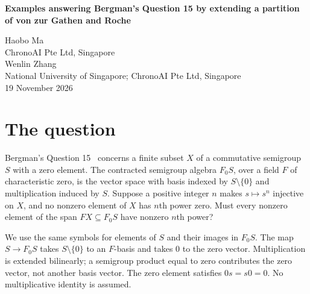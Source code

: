 \documentclass[11pt]{article}
\begin{document}
\begin{center}
{\Large\bfseries Examples answering Bergman's Question 15 by extending
a partition of von zur Gathen and Roche}\par
\vspace{9pt}
Haobo Ma\\
{\small ChronoAI Pte Ltd, Singapore}\\[4pt]
Wenlin Zhang\\
{\small National University of Singapore; ChronoAI Pte Ltd, Singapore}\\[6pt]
19 November 2026
\end{center}
\begin{abstract}
We answer Question 15 of George M.\ Bergman's \emph{Thoughts on Eggert's
Conjecture}, arXiv:1206.0326v2, Section 4, printed page 6, in the negative,
including over $\mathbb Q$ by extending a binomial partition of
von zur Gathen and Roche (1997, Table 2, p.\ 359) to a semigroup.
We construct a commutative semigroup with zero having $59$
elements, generated by three elements which have distinct nonzero sixth
powers, while their complex span in the contracted semigroup algebra contains a nonzero
element with sixth power zero. A $49$-element quotient has the same property.
For these two presentations the cancellation exists over a characteristic-zero
field exactly when the field contains a primitive cube root of unity.
The construction also gives examples for every positive exponent divisible by six.
The older partition yields a $632$-element example with two generators and
exponent $35$ over every characteristic-zero field.
\end{abstract}

\section{The question}
Bergman's Question 15~\cite[Section 4, p.\ 6]{Bergman} concerns a finite subset $X$
of a commutative semigroup $S$ with a zero element. The contracted semigroup
algebra $F_0S$, over a field $F$ of characteristic zero, is the vector space
with basis indexed by $S\setminus\{0\}$ and multiplication induced by $S$.
Suppose a positive integer $n$ makes $s\mapsto s^n$ injective on $X$, and no
nonzero element of $X$ has $n$th power zero. Must every nonzero element of
the span $FX\subseteq F_0S$ have nonzero $n$th power?

We use the same symbols for elements of $S$ and their images in $F_0S$.
The map $S\longrightarrow F_0S$ takes $S\setminus\{0\}$ to an $F$-basis
and takes $0$ to the zero vector. Multiplication is extended bilinearly;
a semigroup product equal to zero contributes the zero vector, not another
basis vector. The zero element satisfies $0s=s0=0$. No multiplicative
identity is assumed.
\end{document}
